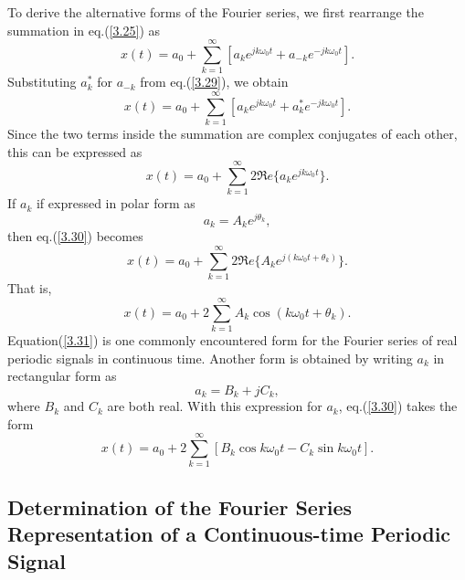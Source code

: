 \documentclass[a4paper,twoside]{book}
\begin{document}
To derive the alternative forms of the Fourier series, we first rearrange the summation in eq.\;(\ref{3.25}) as $$    x(t) = a_{0}+\sum_{k=1}^{\infty}[a_{k}e^{jk\omega_{0}t} + a_{-k}e^{-jk\omega_{0}t}].$$ Substituting $a_k^*$ for $a_{-k}$ from eq.\;(\ref{3.29}), we obtain $$x(t)=a_0+\sum_{k=1}^\infty[a_ke^{jk\omega_0t}+a_k^*e^{-jk\omega_0t}].$$ Since the two terms inside the summation are complex conjugates of each other, this can be expressed as
\begin{equation}
    x(t)=a_0+\sum_{k=1}^\infty2\Re e\{a_ke^{jk\omega_0t}\}.
    \label{3.30}
\end{equation}
If $a_k$ if expressed in polar form as $$a_k=A_ke^{j\theta_k},$$ then eq.\;(\ref{3.30}) becomes $$x(t) = a_0 + \sum_{k=1}^{\infty}2\Re e\{A_ke^{j(k\omega_0t+\theta_k)}\}.$$ That is,
\begin{equation}
    x(t)=a_0+2\sum_{k=1}^\infty A_k\cos(k\omega_0t+\theta_k).
    \label{3.31}
\end{equation}
Equation\;(\ref{3.31}) is one commonly encountered form for the Fourier series of real periodic signals in continuous time. Another form is obtained by writing $a_k$ in rectangular form as $$a_k=B_k+jC_k,$$ where $B_k$ and $C_k$ are both real. With this expression for $a_k$, eq.\;(\ref{3.30}) takes the form
\begin{equation}
    x(t)=a_0+2\sum_{k=1}^\infty[B_k\cos k\omega_0t-C_k\sin k\omega_0t].
    \label{3.32}
\end{equation}

\subsection{Determination of the Fourier Series Representation of a Continuous-time Periodic Signal}
\end{document}

